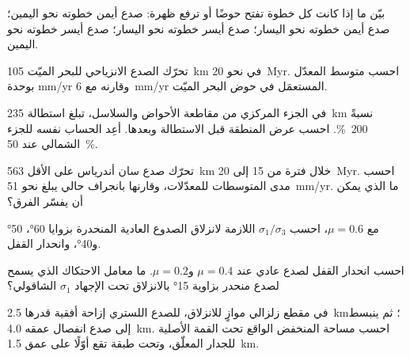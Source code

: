 \begin{exercise}[$\star$]\label{exo:b3:extension-strike-slip:2}
بيّن ما إذا كانت كل خطوة تفتح حوضًا أو ترفع ظهرة: صدع أيمن
خطوته نحو اليمين؛ صدع أيمن خطوته نحو اليسار؛ صدع أيسر خطوته نحو
اليسار؛ صدع أيسر خطوته نحو اليمين.
\end{exercise}

\begin{exercise}[$\star$]\label{exo:b3:extension-strike-slip:3}
تحرّك الصدع الانزياحي للبحر الميّت \qty{105}{km} في نحو \qty{20}{Myr}.
احسب متوسط المعدّل بوحدة \unit{mm/yr} وقارنه مع \qty{6}{mm/yr}
المستعمَل في حوض البحر الميّت.
\end{exercise}

\begin{exercise}[$\star$]\label{exo:b3:extension-strike-slip:4}
في الجزء المركزي من مقاطعة الأحواض والسلاسل، تبلغ استطالة \qty{235}{km} نسبةً
\qty{200}{\percent}. احسب عرض المنطقة قبل الاستطالة وبعدها. أعِد الحساب نفسه
للجزء الشمالي عند \qty{50}{\percent}.
\end{exercise}

\begin{exercise}[$\star\star$]\label{exo:b3:extension-strike-slip:5}
تحرّك صدع سان أندرياس على الأقل \qty{563}{km} خلال فترة من 15 إلى
\qty{20}{Myr}. احسب مدى المتوسطات للمعدّلات، وقارنها بانجراف حالي
يبلغ نحو \qty{51}{mm/yr}. ما الذي يمكن أن يفسّر الفرق؟
\end{exercise}

\begin{exercise}[$\star\star$]\label{exo:b3:extension-strike-slip:6}
مع $\mu = 0.6$، احسب  $\sigma_1/\sigma_3$ اللازمة لانزلاق الصدوع
العادية المنحدرة بزوايا \ang{60}، \ang{50} و\ang{40}، وانحدار القفل.
\end{exercise}

\begin{exercise}[$\star\star$]\label{exo:b3:extension-strike-slip:7}
احسب انحدار القفل لصدع عادي عند $\mu = 0.4$ و$\mu = 0.2$.
ما معامل الاحتكاك الذي يسمح لصدع منحدر بزاوية \ang{15} بالانزلاق تحت
الإجهاد $\sigma_1$ الشاقولي؟
\end{exercise}

\begin{exercise}[$\star\star$]\label{exo:b3:extension-strike-slip:8}
في مقطع زلزالي موازٍ للانزلاق، للصدع اللستري إزاحة أفقية قدرها
\qty{2.5}{km}؛ ثم ينبسط إلى صدع انفصال عمقه \qty{4.0}{km}. احسب مساحة
المنخفض الواقع تحت القمة الأصلية للجدار المعلّق، وتحت طبقة
تقع أوّلًا على عمق \qty{1.5}{km}.
\end{exercise}

